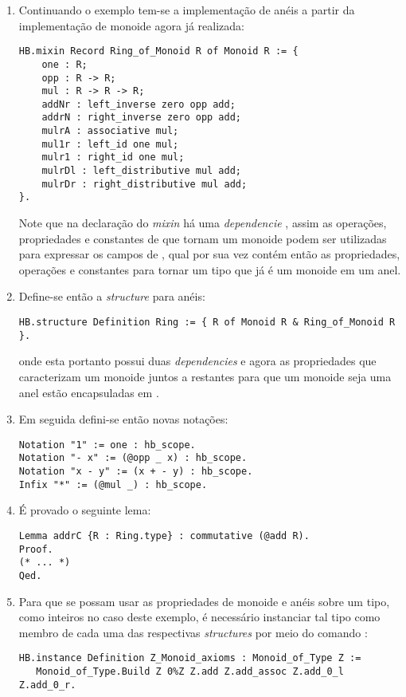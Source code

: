 {{\begin{enumerate}
        \item Continuando o exemplo tem-se a implementação de anéis a partir da implementação de monoide agora já realizada:
            \begin{lstlisting}[language=coq, frame=single, tabsize=1]
HB.mixin Record Ring_of_Monoid R of Monoid R := {
    one : R;
    opp : R -> R;
    mul : R -> R -> R;
    addNr : left_inverse zero opp add;
    addrN : right_inverse zero opp add;
    mulrA : associative mul;
    mul1r : left_id one mul;
    mulr1 : right_id one mul;
    mulrDl : left_distributive mul add;
    mulrDr : right_distributive mul add;
}.
            \end{lstlisting}    
        Note que na declaração do \textit{mixin} há uma \textit{dependencie} , assim as operações, propriedades e constantes de que tornam  um monoide podem ser utilizadas para expressar os campos de , qual por sua vez contém então as propriedades, operações e constantes para tornar um tipo que já é um monoide em um anel.
        
        \item Define-se então a \textit{structure} para anéis:
            \begin{lstlisting}[language=coq, frame=single, tabsize=1]
HB.structure Definition Ring := { R of Monoid R & Ring_of_Monoid R }.
            \end{lstlisting}
        onde esta portanto possui duas \textit{dependencies} e agora as propriedades
        que caracterizam um monoide juntos a restantes para que um monoide seja uma anel estão encapsuladas em .

        \item Em seguida defini-se então novas notações: 
            \begin{lstlisting}[language=coq, frame=single, tabsize=1]
Notation "1" := one : hb_scope.
Notation "- x" := (@opp _ x) : hb_scope.
Notation "x - y" := (x + - y) : hb_scope.
Infix "*" := (@mul _) : hb_scope.
            \end{lstlisting}

        \item É provado o seguinte lema:
            \begin{lstlisting}[language=coq, frame=single, tabsize=1]
Lemma addrC {R : Ring.type} : commutative (@add R).
Proof.
(* ... *)
Qed.
            \end{lstlisting}

        \item \label{item:inst} Para que se possam usar as propriedades de monoide e anéis sobre um tipo, como inteiros no caso deste exemplo, é necessário instanciar tal tipo como membro de cada uma das respectivas \textit{structures} por meio do comando :
            \begin{lstlisting}[language=coq, frame=single, tabsize=1]
HB.instance Definition Z_Monoid_axioms : Monoid_of_Type Z :=
   Monoid_of_Type.Build Z 0%Z Z.add Z.add_assoc Z.add_0_l Z.add_0_r.


\end{lstlisting}
\end{enumerate}}}
